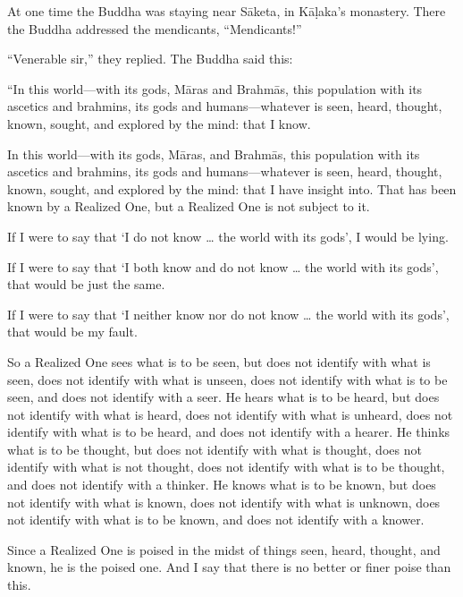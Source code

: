 \documentclass[12pt,openany]{book}%
\begin{document}
At one time the Buddha was staying near \textsanskrit{Sāketa}, in \textsanskrit{Kāḷaka}’s monastery. There the Buddha addressed the mendicants, “Mendicants!” 

“Venerable sir,” they replied. The Buddha said this: 

“In this world—with its gods, \textsanskrit{Māras} and \textsanskrit{Brahmās}, this population with its ascetics and brahmins, its gods and humans—whatever is seen, heard, thought, known, sought, and explored by the mind: that I know. 

In this world—with its gods, \textsanskrit{Māras}, and \textsanskrit{Brahmās}, this population with its ascetics and brahmins, its gods and humans—whatever is seen, heard, thought, known, sought, and explored by the mind: that I have insight into. That has been known by a Realized One, but a Realized One is not subject to it. 

If I were to say that ‘I do not know … the world with its gods’, I would be lying. 

If I were to say that ‘I both know and do not know … the world with its gods’, that would be just the same. 

If I were to say that ‘I neither know nor do not know … the world with its gods’, that would be my fault. 

So a Realized One sees what is to be seen, but does not identify with what is seen, does not identify with what is unseen, does not identify with what is to be seen, and does not identify with a seer. He hears what is to be heard, but does not identify with what is heard, does not identify with what is unheard, does not identify with what is to be heard, and does not identify with a hearer. He thinks what is to be thought, but does not identify with what is thought, does not identify with what is not thought, does not identify with what is to be thought, and does not identify with a thinker. He knows what is to be known, but does not identify with what is known, does not identify with what is unknown, does not identify with what is to be known, and does not identify with a knower. 

Since a Realized One is poised in the midst of things seen, heard, thought, and known, he is the poised one. And I say that there is no better or finer poise than this. 
\end{document}

